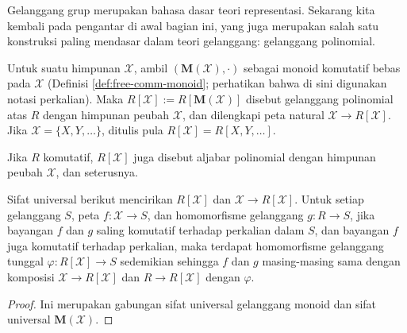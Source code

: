 Gelanggang grup merupakan bahasa dasar teori representasi. Sekarang kita kembali pada pengantar di awal bagian ini, yang juga merupakan salah satu konstruksi paling mendasar dalam teori gelanggang: gelanggang polinomial.
\begin{definition} 
	Untuk suatu himpunan $\mathcal{X}$, ambil $(\mathbf{M}(\mathcal{X}), \cdot)$ sebagai monoid komutatif bebas pada $\mathcal{X}$ (Definisi \ref{def:free-comm-monoid}; perhatikan bahwa di sini digunakan notasi perkalian). Maka $R[\mathcal{X}] := R[\mathbf{M}(\mathcal{X})]$ disebut gelanggang polinomial atas $R$ dengan himpunan peubah $\mathcal{X}$, dan dilengkapi peta natural $\mathcal{X} \to R[\mathcal{X}]$. Jika $\mathcal{X} = \{X, Y, \ldots\}$, ditulis pula $R[\mathcal{X}] = R[X, Y, \ldots]$.
\end{definition}
Jika $R$ komutatif, $R[\mathcal{X}]$ juga disebut aljabar polinomial dengan himpunan peubah $\mathcal{X}$, dan seterusnya.

\begin{proposition}\label{prop:polynomial-ring-universal}
	Sifat universal berikut mencirikan $R[\mathcal{X}]$ dan $\mathcal{X} \to R[\mathcal{X}]$. Untuk setiap gelanggang $S$, peta $f: \mathcal{X} \to S$, dan homomorfisme gelanggang $g: R \to S$, jika bayangan $f$ dan $g$ saling komutatif terhadap perkalian dalam $S$, dan bayangan $f$ juga komutatif terhadap perkalian, maka terdapat homomorfisme gelanggang tunggal $\varphi: R[\mathcal{X}] \to S$ sedemikian sehingga $f$ dan $g$ masing-masing sama dengan komposisi $\mathcal{X} \to R[\mathcal{X}]$ dan $R \to R[\mathcal{X}]$ dengan $\varphi$.
\end{proposition}
\begin{proof}
	Ini merupakan gabungan sifat universal gelanggang monoid dan sifat universal $\mathbf{M}(\mathcal{X})$.
\end{proof}

